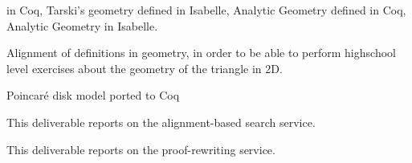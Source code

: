 \begin{workpackage}
\begin{wpdelivs}
\begin{wpdeliv}[due=3,miles=startup,id=aligninggeometries,dissem=PU,nature=DEM,lead=Bel]
{      in Coq, Tarski's geometry defined in Isabelle, Analytic Geometry
      defined in Coq, Analytic Geometry in Isabelle.}
  \end{wpdeliv}
  \begin{wpdeliv}[due=3,miles=startup,id=aligninggeometrieshighschool,dissem=PU,nature=DEM,lead=Str]
    {Alignment of definitions in geometry, in order to be able to
      perform highschool level exercises about the geometry of the
      triangle in 2D.}
  \end{wpdeliv}
  \begin{wpdeliv}[due=3,miles=startup,id=aligningpoincare,dissem=PU,nature=DEM,lead=Bel]
    {Poincar\'e disk model ported to Coq}
  \end{wpdeliv}
	\begin{wpdeliv}[due=36,miles=???,id=alignsearch,dissem=PU,nature=DEM,lead=Fau]
	This deliverable reports on the alignment-based search service.
	\end{wpdeliv}
	
	\begin{wpdeliv}[due=36,miles=???,id=alignproofrewr,dissem=PU,nature=DEM,lead=Bol]
	This deliverable reports on the proof-rewriting service.
	\end{wpdeliv}

\end{wpdelivs}
\end{workpackage}

